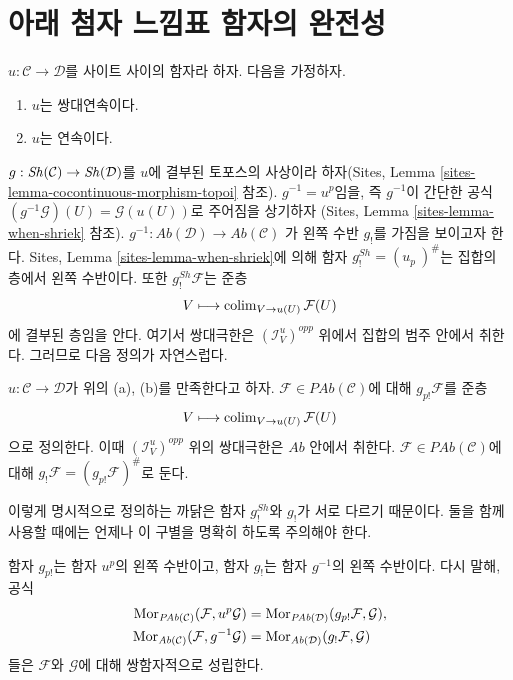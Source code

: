 \section{아래 첨자 느낌표 함자의 완전성}
\label{section-exactness-lower-shriek}

\noindent
$u : \mathcal{C} \to \mathcal{D}$를 사이트 사이의 함자라 하자.
다음을 가정하자.
\begin{enumerate}
\item[(a)] $u$는 쌍대연속이다.
\item[(b)] $u$는 연속이다.
\end{enumerate}
$g : \mathop{\mathit{Sh}}\nolimits(\mathcal{C}) \to \mathop{\mathit{Sh}}\nolimits(\mathcal{D})$를 $u$에 결부된 토포스의
사상이라 하자(Sites, Lemma
\ref{sites-lemma-cocontinuous-morphism-topoi} 참조).
$g^{-1} = u^p$임을, 즉 $g^{-1}$이 간단한 공식
$(g^{-1}\mathcal{G})(U) = \mathcal{G}(u(U))$로 주어짐을 상기하자
(Sites, Lemma \ref{sites-lemma-when-shriek} 참조).
$g^{-1} : \textit{Ab}(\mathcal{D}) \to \textit{Ab}(\mathcal{C})$
가 왼쪽 수반 $g_!$를 가짐을 보이고자 한다. Sites, Lemma
\ref{sites-lemma-when-shriek}에 의해 함자
$g^{Sh}_! = (u_p\ )^\#$는 집합의 층에서 왼쪽 수반이다.
또한 $g^{Sh}_!\mathcal{F}$는 준층
$$
V \longmapsto \mathop{\mathrm{colim}}\nolimits_{V \to u(U)} \mathcal{F}(U)
$$
에 결부된 층임을 안다. 여기서 쌍대극한은
$(\mathcal{I}_V^u)^{opp}$ 위에서 집합의 범주 안에서 취한다.
그러므로 다음 정의가 자연스럽다.

\begin{definition}
\label{definition-g-shriek}
$u : \mathcal{C} \to \mathcal{D}$가 위의 (a), (b)를 만족한다고 하자.
$\mathcal{F} \in \textit{PAb}(\mathcal{C})$에 대해
{\it $g_{p!}\mathcal{F}$}를 준층
$$
V \longmapsto \mathop{\mathrm{colim}}\nolimits_{V \to u(U)} \mathcal{F}(U)
$$
으로 정의한다. 이때 $(\mathcal{I}_V^u)^{opp}$ 위의 쌍대극한은
$\textit{Ab}$ 안에서 취한다. $\mathcal{F} \in \textit{PAb}(\mathcal{C})$에
대해 {\it $g_!\mathcal{F} = (g_{p!}\mathcal{F})^\#$}로 둔다.
\end{definition}

\noindent
이렇게 명시적으로 정의하는 까닭은 함자 $g^{Sh}_!$와 $g_!$가 서로
다르기 때문이다. 둘을 함께 사용할 때에는 언제나 이 구별을 명확히
하도록 주의해야 한다.

\begin{lemma}
\label{lemma-g-shriek-adjoint}
함자 $g_{p!}$는 함자 $u^p$의 왼쪽 수반이고, 함자 $g_!$는 함자
$g^{-1}$의 왼쪽 수반이다. 다시 말해, 공식
\begin{align*}
\mathop{\mathrm{Mor}}\nolimits_{\textit{PAb}(\mathcal{C})}(\mathcal{F}, u^p\mathcal{G})
& =
\mathop{\mathrm{Mor}}\nolimits_{\textit{PAb}(\mathcal{D})}(g_{p!}\mathcal{F}, \mathcal{G}), \\
\mathop{\mathrm{Mor}}\nolimits_{\textit{Ab}(\mathcal{C})}(\mathcal{F}, g^{-1}\mathcal{G})
& =
\mathop{\mathrm{Mor}}\nolimits_{\textit{Ab}(\mathcal{D})}(g_!\mathcal{F}, \mathcal{G})
\end{align*}
들은 $\mathcal{F}$와 $\mathcal{G}$에 대해 쌍함자적으로 성립한다.
\end{lemma}

